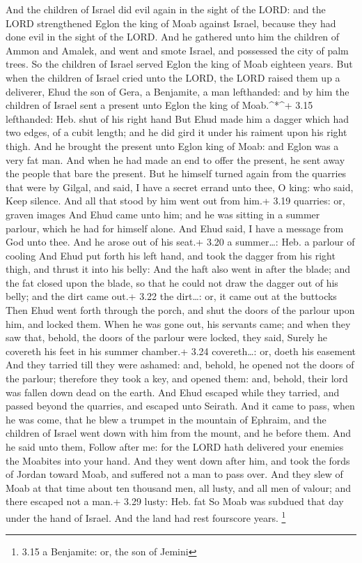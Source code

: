  And the children of Israel did evil again in the sight of
the LORD: and the LORD strengthened Eglon the king of Moab against
Israel, because they had done evil in the sight of the LORD.
 And he gathered unto him the children of Ammon and Amalek,
and went and smote Israel, and possessed the city of palm trees.
 So the children of Israel served Eglon the king of Moab
eighteen years.  But when the children of Israel cried unto
the LORD, the LORD raised them up a deliverer, Ehud the son of Gera, a
Benjamite, a man lefthanded: and by him the children of Israel sent a
present unto Eglon the king of Moab.\^{}*\^{}+ 3.15 lefthanded: Heb.
shut of his right hand  But Ehud made him a dagger which
had two edges, of a cubit length; and he did gird it under his raiment
upon his right thigh.  And he brought the present unto
Eglon king of Moab: and Eglon was a very fat man.  And when
he had made an end to offer the present, he sent away the people that
bare the present.  But he himself turned again from the
quarries that were by Gilgal, and said, I have a secret errand unto
thee, O king: who said, Keep silence. And all that stood by him went out
from him.+ 3.19 quarries: or, graven images  And Ehud came
unto him; and he was sitting in a summer parlour, which he had for
himself alone. And Ehud said, I have a message from God unto thee. And
he arose out of his seat.+ 3.20 a summer\ldots: Heb. a parlour of
cooling  And Ehud put forth his left hand, and took the
dagger from his right thigh, and thrust it into his belly: 
And the haft also went in after the blade; and the fat closed upon the
blade, so that he could not draw the dagger out of his belly; and the
dirt came out.+ 3.22 the dirt\ldots: or, it came out at the buttocks
 Then Ehud went forth through the porch, and shut the doors
of the parlour upon him, and locked them.  When he was gone
out, his servants came; and when they saw that, behold, the doors of the
parlour were locked, they said, Surely he covereth his feet in his
summer chamber.+ 3.24 covereth\ldots: or, doeth his easement
 And they tarried till they were ashamed: and, behold, he
opened not the doors of the parlour; therefore they took a key, and
opened them: and, behold, their lord was fallen down dead on the earth.
 And Ehud escaped while they tarried, and passed beyond the
quarries, and escaped unto Seirath.  And it came to pass,
when he was come, that he blew a trumpet in the mountain of Ephraim, and
the children of Israel went down with him from the mount, and he before
them.  And he said unto them, Follow after me: for the LORD
hath delivered your enemies the Moabites into your hand. And they went
down after him, and took the fords of Jordan toward Moab, and suffered
not a man to pass over.  And they slew of Moab at that time
about ten thousand men, all lusty, and all men of valour; and there
escaped not a man.+ 3.29 lusty: Heb. fat  So Moab was
subdued that day under the hand of Israel. And the land had rest
fourscore years. \footnote{3.15 a Benjamite: or, the son of Jemini}

